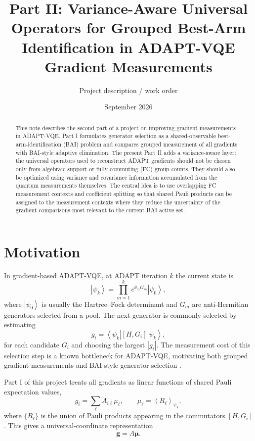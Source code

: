 \documentclass[11pt]{article}
\title{Part II: Variance-Aware Universal Operators for Grouped Best-Arm Identification in ADAPT-VQE Gradient Measurements}
\author{Project description / work order}
\date{September 2026}
\newcommand{\ket}[1]{\left|#1\right\rangle}
\newcommand{\bra}[1]{\left\langle #1\right|}
\newcommand{\expect}[1]{\left\langle #1\right\rangle}
\begin{document}
\maketitle

\begin{abstract}
This note describes the second part of a project on improving gradient measurements in ADAPT-VQE. Part I formulates generator selection as a shared-observable best-arm-identification (BAI) problem and compares grouped measurement of all gradients with BAI-style adaptive elimination. The present Part II adds a variance-aware layer: the universal operators used to reconstruct ADAPT gradients should not be chosen only from algebraic support or fully commuting (FC) group counts. They should also be optimized using variance and covariance information accumulated from the quantum measurements themselves. The central idea is to use overlapping FC measurement contexts and coefficient splitting so that shared Pauli products can be assigned to the measurement contexts where they reduce the uncertainty of the gradient comparisons most relevant to the current BAI active set.
\end{abstract}

\section{Motivation}

In gradient-based ADAPT-VQE, at ADAPT iteration $k$ the current state is
\begin{equation}
    \ket{\psi_k}=\prod_{m=1}^{k} e^{\theta_m G_m}\ket{\psi_0},
\end{equation}
where $\ket{\psi_0}$ is usually the Hartree--Fock determinant and $G_m$ are anti-Hermitian generators selected from a pool. The next generator is commonly selected by estimating
\begin{equation}
    g_i = \bra{\psi_k}[H,G_i]\ket{\psi_k},
    \label{eq:adapt-gradient}
\end{equation}
for each candidate $G_i$ and choosing the largest $|g_i|$. The measurement cost of this selection step is a known bottleneck for ADAPT-VQE, motivating both grouped gradient measurements and BAI-style generator selection \cite{Anastasiou2023ReallyMeasure,HuangIzmaylov2025QuantumGambling}.

Part I of this project treats all gradients as linear functions of shared Pauli expectation values,
\begin{equation}
    g_i = \sum_{\ell} A_{i\ell}\mu_\ell,
    \qquad
    \mu_\ell = \expect{R_\ell}_{\psi_k},
    \label{eq:g-Amu}
\end{equation}
where $\{R_\ell\}$ is the union of Pauli products appearing in the commutators $[H,G_i]$. This gives a universal-coordinate representation
\begin{equation}
    \bm g = A\bm\mu.
\end{equation}
\end{document}
